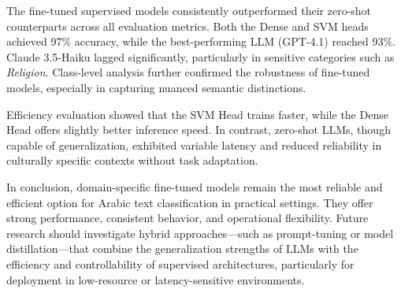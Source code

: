 \documentclass[sn-mathphys-num]{sn-jnl}
\begin{document}
The fine-tuned supervised models consistently outperformed their zero-shot counterparts across all evaluation metrics. Both the Dense and SVM heads achieved 97\% accuracy, while the best-performing LLM (GPT-4.1) reached 93\%. Claude 3.5-Haiku lagged significantly, particularly in sensitive categories such as \textit{Religion}. Class-level analysis further confirmed the robustness of fine-tuned models, especially in capturing nuanced semantic distinctions.

Efficiency evaluation showed that the SVM Head trains faster, while the Dense Head offers slightly better inference speed. In contrast, zero-shot LLMs, though capable of generalization, exhibited variable latency and reduced reliability in culturally specific contexts without task adaptation.

In conclusion, domain-specific fine-tuned models remain the most reliable and efficient option for Arabic text classification in practical settings. They offer strong performance, consistent behavior, and operational flexibility. Future research should investigate hybrid approaches—such as prompt-tuning or model distillation—that combine the generalization strengths of LLMs with the efficiency and controllability of supervised architectures, particularly for deployment in low-resource or latency-sensitive environments.






%  

\end{document}
